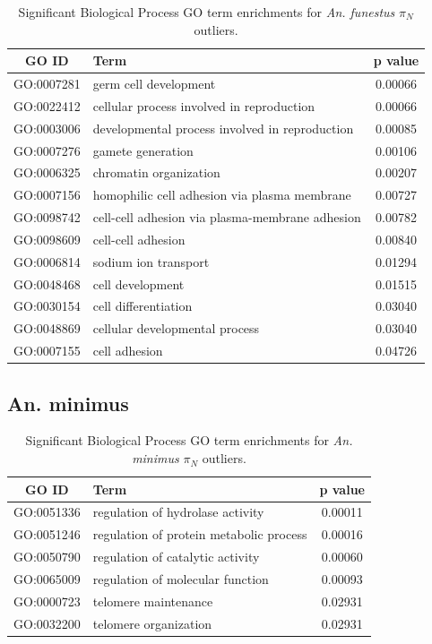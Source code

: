 \begin{table}[H]
    \centering
    \begin{tabular}{clc}
        \toprule
        \textbf{GO ID} & \textbf{Term} & \textbf{p value} \\
        \midrule
        GO:0007281 & germ cell development & 0.00066 \\ 
        GO:0022412 & cellular process involved in reproduction & 0.00066 \\ 
        GO:0003006 & developmental process involved in reproduction & 0.00085 \\ 
        GO:0007276 & gamete generation & 0.00106 \\ 
        GO:0006325 & chromatin organization & 0.00207 \\ 
        GO:0007156 & homophilic cell adhesion via plasma membrane & 0.00727 \\ 
        GO:0098742 & cell-cell adhesion via plasma-membrane adhesion & 0.00782 \\ 
        GO:0098609 & cell-cell adhesion & 0.00840\\ 
        GO:0006814 & sodium ion transport & 0.01294 \\ 
        GO:0048468 & cell development & 0.01515 \\ 
        GO:0030154 & cell differentiation & 0.03040\\ 
        GO:0048869 & cellular developmental process & 0.03040\\ 
        GO:0007155 & cell adhesion & 0.04726 \\ \bottomrule
    \end{tabular}
        \caption{Significant Biological Process GO term enrichments for \textit{An. funestus} $\pi_{N}$ outliers.}
    \label{afunGOpi}
\end{table}

\subsection{An. minimus}

\begin{table}[H]
    \centering
\begin{tabular}{clc}
        \toprule
        \textbf{GO ID} & \textbf{Term} & \textbf{p value} \\
        \midrule
        GO:0051336 & regulation of hydrolase activity & 0.00011 \\ 
        GO:0051246 & regulation of protein metabolic process & 0.00016 \\ 
        GO:0050790 & regulation of catalytic activity & 0.00060\\ 
        GO:0065009 & regulation of molecular function & 0.00093 \\ 
        GO:0000723 & telomere maintenance & 0.02931 \\ 
        GO:0032200 & telomere organization & 0.02931 \\ \bottomrule
    \end{tabular}
        \caption{Significant Biological Process GO term enrichments for \textit{An. minimus} $\pi_{N}$ outliers.}
    \label{aminGOpi}
\end{table}

